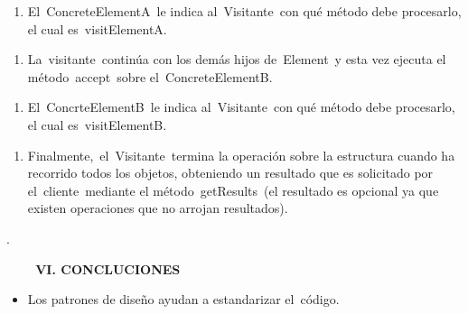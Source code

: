 \documentclass[12pt]{article}
\begin{document}
\begin{multicols}{2}
\begin{enumerate}[label*={\fontsize{9pt}{9pt}\selectfont \arabic*.}]
	\item {\fontsize{9pt}{10.8pt}\selectfont El ConcreteElementA le indica al Visitante con qué método debe procesarlo, el cual es visitElementA. \par}
\end{enumerate}\par

\begin{enumerate}[label*={\fontsize{9pt}{9pt}\selectfont \arabic*.}]
	\item {\fontsize{9pt}{10.8pt}\selectfont La visitante continúa con los demás hijos de Element y esta vez ejecuta el método accept sobre el ConcreteElementB. \par}
\end{enumerate}\par

\begin{enumerate}[label*={\fontsize{9pt}{9pt}\selectfont \arabic*.}]
	\item {\fontsize{9pt}{10.8pt}\selectfont El ConcrteElementB le indica al Visitante con qué método debe procesarlo, el cual es visitElementB. \par}
\end{enumerate}\par

\begin{enumerate}[label*={\fontsize{9pt}{9pt}\selectfont \arabic*.}]
	\item {\fontsize{9pt}{10.8pt}\selectfont Finalmente, el Visitante termina la operación sobre la estructura cuando ha recorrido todos los objetos, obteniendo un resultado que es solicitado por el cliente mediante el método getResults (el resultado es opcional ya que existen operaciones que no arrojan resultados). \par}
\end{enumerate}\par


\vspace{\baselineskip}

\vspace{\baselineskip}
{\fontsize{9pt}{10.8pt}\selectfont .\par}\par

\textbf{\ \ \ \  VI. CONCLUCIONES}\par

\begin{itemize}
	\item {\fontsize{9pt}{10.8pt}\selectfont Los patrones de diseño ayudan a estandarizar el código. \par}\par


\end{itemize}
\end{multicols}
\end{document}
